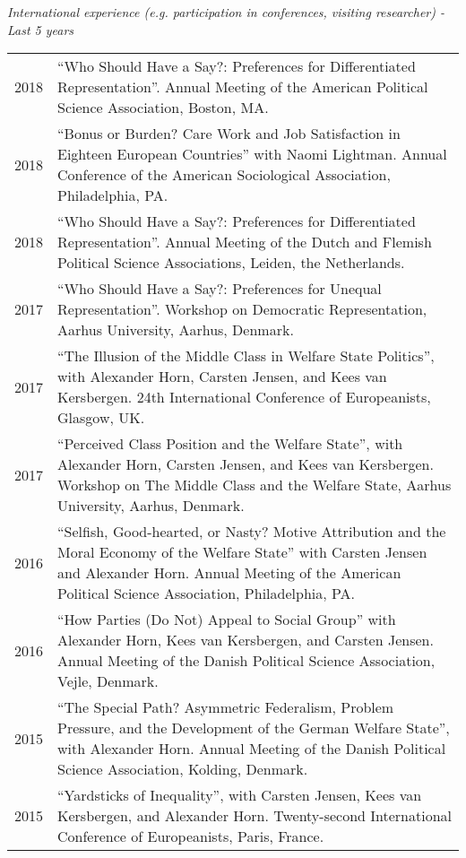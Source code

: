 \documentclass[letterpaper,fontsize=10pt]{scrartcl}
\begin{document}
	\textit{International experience (e.g. participation in conferences, visiting researcher) - Last 5 years}
	\vspace{-1em}
	\begin{tabularx}{\textwidth}{@{} l X @{} }
		2018 & ``Who Should Have a Say?: Preferences for Differentiated Representation''. Annual Meeting of the American Political Science Association, Boston, MA.\\[1ex]
		2018 & ``Bonus or Burden? Care Work and Job Satisfaction in Eighteen European Countries'' with Naomi Lightman. Annual Conference of the American Sociological Association, Philadelphia, PA.\\[1ex]
		2018 & ``Who Should Have a Say?: Preferences for Differentiated Representation''. Annual Meeting of the Dutch and Flemish Political Science Associations, Leiden, the Netherlands.\\[1ex]
			2017 & ``Who Should Have a Say?: Preferences for Unequal Representation''. Workshop on Democratic Representation, Aarhus University, Aarhus, Denmark.\\[1ex]
			2017 & ``The Illusion of the Middle Class in Welfare State Politics'', with Alexander Horn, Carsten Jensen, and Kees van Kersbergen. 24th International Conference of Europeanists, Glasgow, UK.\\[1ex]
			2017 & ``Perceived Class Position and the Welfare State'', with Alexander Horn, Carsten Jensen, and Kees van Kersbergen. Workshop on The Middle Class and the Welfare State, Aarhus University, Aarhus, Denmark.\\[1ex]
			2016 & ``Selfish, Good-hearted, or Nasty? Motive Attribution and the Moral Economy of the Welfare State'' with Carsten Jensen and Alexander Horn. Annual Meeting of the American Political Science Association, Philadelphia, PA.\\[1ex]
			2016 & ``How Parties (Do Not) Appeal to Social Group'' with Alexander Horn, Kees van Kersbergen, and Carsten Jensen. Annual Meeting of the Danish Political Science Association, Vejle, Denmark.\\[1ex]
			2015 & ``The Special Path? Asymmetric Federalism, Problem Pressure, and the Development of the German Welfare State'', with Alexander Horn. Annual Meeting of the Danish Political Science Association, Kolding, Denmark.\\[1ex]
			2015 & ``Yardsticks of Inequality'', with Carsten Jensen, Kees van Kersbergen, and Alexander Horn. Twenty-second International Conference of Europeanists, Paris, France.\\[1ex]

\end{tabularx}
\end{document}
